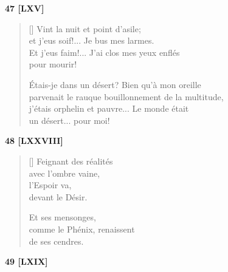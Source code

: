 \documentclass[a4paper,12pt]{book}
\begin{document}
\bigskip

\begin{center}
  \textbf{47 [LXV]}
\end{center}

\settowidth{\versewidth}{parvenait le rauque bouillonnement de la multitude,}

\begin{verse}[\versewidth]
  Vint la nuit et point d'asile; \\
  et j'eus soif!... Je bus mes larmes. \\
  Et j'eus faim!... J'ai clos mes yeux enflés \\
  pour mourir!

  Étais-je dans un désert? Bien qu'à mon oreille \\
  parvenait le rauque bouillonnement de la multitude, \\
  j'étais orphelin et pauvre... Le monde était \\
  un désert... pour moi!
\end{verse}

\bigskip

\begin{center}
  \textbf{48 [LXXVIII]}
\end{center}

\settowidth{\versewidth}{comme le Phénix, renaissent}

\begin{verse}[\versewidth]
  Feignant des réalités \\
  avec l'ombre vaine, \\
  l'Espoir va, \\
  devant le Désir.

  Et ses mensonges, \\
  comme le Phénix, renaissent \\
  de ses cendres.
\end{verse}

\bigskip

\begin{center}
  \textbf{49 [LXIX]}
\end{center}

\settowidth{\versewidth}{et son éclat perdure encore quand nous mourons:}
\end{document}
